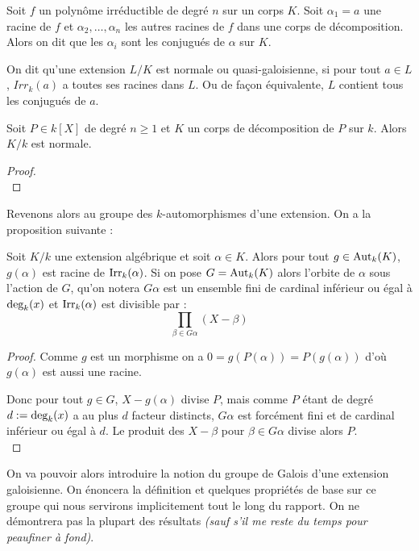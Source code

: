 \documentclass[a4paper]{article} %
\numberwithin{section}{part}
\numberwithin{equation}{section}
\newcommand\Irr[2]{\textup{Irr}_{#1}(#2)}
\begin{document}
Soit $f$ un polynôme irréductible de degré $n$ sur un corps $K$. Soit $\alpha_1 
= a$ une racine de $f$ et $\alpha_2,\dots,\alpha_n$ les autres racines de $f$ 
dans une corps de décomposition. Alors on dit que les $\alpha_i$ sont les 
conjugués de $\alpha$ sur $K$.
\begin{defn}
On dit qu'une extension $L/K$ est normale ou quasi-galoisienne, si pour tout
$a\in L$, $Irr_k(a)$ a toutes ses racines dans $L$. Ou de façon équivalente, $L$
contient tous les conjugués de $a$.
\end{defn}

\begin{prop}
\label{prop:decompnorm}
Soit $P\in k[X]$ de degré $n\geq 1$ et $K$ un corps de décomposition de $P$ sur
$k$. Alors $K/k$ est normale.
\end{prop}
\begin{proof}
\cite[Chap. VIII, p.~167]{Pol}\\
\end{proof}

Revenons alors au groupe des $k$-automorphismes d'une extension. On a la
proposition suivante :

\begin{prop}
Soit $K/k$ une extension algébrique et soit $\alpha\in K$. Alors pour tout
$g\in\textup{Aut}_k(K)$, $g(\alpha)$ est racine de $\Irr{k}{\alpha}$. Si on
pose $G = \textup{Aut}_k(K)$ alors l'orbite de $\alpha$ sous l'action de $G$,
qu'on notera $G\alpha$ est un ensemble fini de cardinal inférieur ou égal à
$\textup{deg}_k(x)$ et $\Irr{k}{\alpha}$ est divisible par :
\[\prod_{\beta\in G\alpha}{(X - \beta)}\]
\end{prop}
\begin{proof}
Comme $g$ est un morphisme on a $0 = g(P(\alpha)) = P(g(\alpha))$ d'où
$g(\alpha)$ est aussi une racine.\par
Donc pour tout $g\in G$, $X - g(\alpha)$ divise $P$, mais comme $P$ étant de
degré $d := \textup{deg}_k(x)$ a au plus $d$ facteur distincts, $G\alpha$ est 
forcément fini et de cardinal inférieur ou égal à $d$. Le produit des $X -
\beta$ pour $\beta\in G\alpha$ divise alors $P$.\\
\end{proof}

On va pouvoir alors introduire la notion du groupe de Galois d'une extension
galoisienne. On énoncera la définition et quelques propriétés de base sur ce
groupe qui nous servirons implicitement tout le long du rapport. On ne
démontrera pas la plupart des résultats \textit{(sauf s'il me reste du temps
pour peaufiner à fond)}. 
\end{document}
